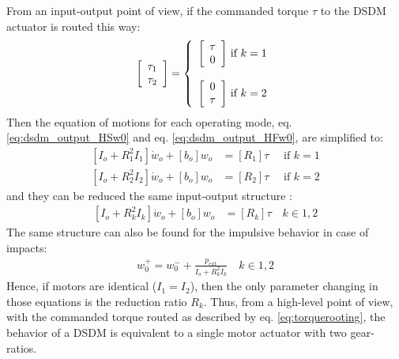 From an input-output point of view, if the commanded torque $\tau$ to the DSDM actuator is routed this way:
%
\begin{align}
\left[ \begin{array}{c}
\tau_1 \\
\tau_2
\end{array} \right]
 =  
\left\{
\begin{array}{c@{}c}
\left[ \begin{array}{c} \tau \\ 0 \end{array} \right] & \text{ if } k=1  \\ \\
\left[ \begin{array}{c} 0 \\ \tau \end{array} \right] & \text{ if } k=2  \\
\end{array} 
\right. 
\label{eq:torquerooting}
\end{align}
%
Then the equation of motions for each operating mode, eq. \eqref{eq:dsdm_output_HSw0} and eq. \eqref{eq:dsdm_output_HFw0}, are simplified to:
%
\begin{align}
\left[ I_o + R_1^2 I_1 \right] \dot{w}_o +  \left[ b_o \right] w_o  &= \left[ R_1 \right] \tau  \quad \text{ if } k=1  %
\label{eq:dsdm_output_R1} \\
\left[ I_o + R_2^2 I_2 \right] \dot{w}_o +  \left[ b_o \right] w_o  &= \left[ R_2 \right] \tau  \quad \text{ if } k=2  %
\label{eq:dsdm_output_R2}
\end{align}
%
and they can be reduced the same input-output structure :
%
\begin{align}
\left[ I_o + R_k^2 I_k \right] \dot{w}_o +  \left[ b_o \right] w_o  &= \left[ R_k \right] \tau \quad k \in {1,2}
\label{eq:dsdm_output_R} 
\end{align}
%
The same structure can also be found for the impulsive behavior in case of impacts:
%
\begin{align}
w_0^+  =  w_0^- + \frac{p_{ext}}{I_o + R_k^2  I_k } \quad k \in {1,2}
\end{align}
%
Hence, if motors are identical ($I_1=I_2$), then the only parameter changing in those equations is the reduction ratio $R_k$. Thus, from a high-level point of view, with the commanded torque routed as described by eq. \eqref{eq:torquerooting}, the behavior of a DSDM is equivalent to a single motor actuator with two gear-ratios. 


